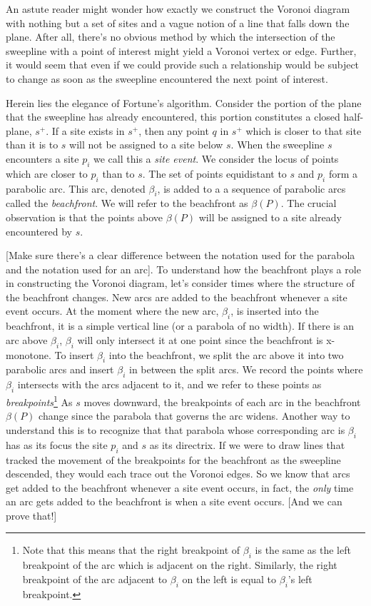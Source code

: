 \documentclass[12pt,twoside]{reedthesis}
\begin{document}
  An astute reader might wonder how exactly we construct the Voronoi diagram with nothing but a set of sites and a vague notion of a line that falls down the plane. After all, there's no obvious method by which the intersection of the sweepline with a point of interest might yield a Voronoi vertex or edge. Further, it would seem that even if we could provide such a relationship would be subject to change as soon as the sweepline encountered the next point of interest. \par
  Herein lies the elegance of Fortune's algorithm. Consider the portion of the plane that the sweepline has already encountered, this portion constitutes a closed half-plane, $s^+$. If a site exists in $s^+$, then any point $q$ in $s^+$ which is closer to that site than it is to $s$ will not be assigned to a site below $s$. When the sweepline $s$ encounters a site $p_{i}$ we call this a \emph{site event}. We consider the locus of points which are closer to $p_{i}$ than to $s$. The set of points equidistant to $s$ and $p_{i}$ form a parabolic arc. This arc, denoted $\beta_{i}$, is added to a a sequence of parabolic arcs called the \emph{beachfront}. We will refer to the beachfront as $\beta(P)$. The crucial observation is that the points above $\beta(P)$ will be assigned to a site already encountered by $s$. \par

  [Make sure there's a clear difference between the notation used for the parabola and the notation used for an arc].
  To understand how the beachfront plays a role in constructing the Voronoi diagram, let's consider times where the structure of the beachfront changes. New arcs are added to the beachfront whenever a site event occurs. At the moment where the new arc, $\beta_{i}$, is inserted into the beachfront, it is a simple vertical line (or a parabola of no width). If there is an arc above $\beta_{i}$, $\beta_{i}$ will only intersect it at one point since the beachfront is x-monotone. To insert $\beta_{i}$ into the beachfront, we split the arc above it into two parabolic arcs and insert $\beta_{i}$ in between the split arcs. We record the points where $\beta_{i}$ intersects with the arcs adjacent to it, and we refer to these points as \emph{breakpoints}\footnote{Note that this means that the right breakpoint of $\beta_{i}$ is the same as the left breakpoint of the arc which is adjacent on the right. Similarly, the right breakpoint of the arc adjacent to $\beta_{i}$ on the left is equal to $\beta_{i}$'s left breakpoint.} As $s$ moves downward, the breakpoints of each arc in the beachfront $\beta(P)$ change since the parabola that governs the arc widens. Another way to understand this is to recognize that that parabola whose corresponding arc is $\beta_{i}$ has as its focus the site $p_{i}$ and $s$ as its directrix. If we were to draw lines that tracked the movement of the breakpoints for the beachfront as the sweepline descended, they would each trace out the Voronoi edges. So we know that arcs get added to the beachfront whenever a site event occurs, in fact, the \emph{only} time an arc gets added to the beachfront is when a site event occurs. [And we can prove that!] \par
\end{document}
